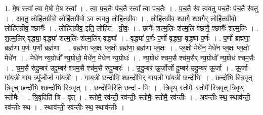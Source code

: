 \documentclass[17pt]{extarticle}
\begin{document}
1. मे॒ष स्त्वा᳚ त्वा मे॒षो मे॒ष स्त्वा᳚ । . त्वा॒ प॒च॒तैः प॑च॒तै स्त्वा᳚ त्वा पच॒तैः । . प॒च॒तै र॑व त्ववतु पच॒तैः प॑च॒तै र॑वतु । . अ॒व॒तु॒ लोहि॑तग्रीवो॒ लोहि॑तग्रीवो ऽव त्ववतु॒ लोहि॑तग्रीवः । . लोहि॑तग्रीव॒ श्छागै॒ श्छागै॒र् लोहि॑तग्रीवो॒ लोहि॑तग्रीव॒ श्छागैः᳚ । . लोहि॑तग्रीव॒ इति॒ लोहि॑त - ग्री॒वः॒ । . छागैः᳚ शल्म॒लिः श॑ल्म॒लि श्छागै॒ श्छागैः᳚ शल्म॒लिः । . श॒ल्म॒लिर् वृद्ध्या॒ वृद्ध्या॑ शल्म॒लिः श॑ल्म॒लिर् वृद्ध्या᳚ । . वृद्ध्या॑ प॒र्णः प॒र्णो वृद्ध्या॒ वृद्ध्या॑ प॒र्णः । . प॒र्णो ब्रह्म॑णा॒ ब्रह्म॑णा प॒र्णः प॒र्णो ब्रह्म॑णा । . ब्रह्म॑णा प्ल॒क्षः प्ल॒क्षो ब्रह्म॑णा॒ ब्रह्म॑णा प्ल॒क्षः । . प्ल॒क्षो मेधे॑न॒ मेधे॑न प्ल॒क्षः प्ल॒क्षो मेधे॑न । . मेधे॑न न्य॒ग्रोधो᳚ न्य॒ग्रोधो॒ मेधे॑न॒ मेधे॑न न्य॒ग्रोधः॑ । . न्य॒ग्रोध॑ श्चम॒सै श्च॑म॒सैर् न्य॒ग्रोधो᳚ न्य॒ग्रोध॑ श्चम॒सैः । . च॒म॒सै रु॑दु॒म्बर॑ उदु॒म्बर॑ श्चम॒सै श्च॑म॒सै रु॑दु॒म्बरः॑ । . उ॒दु॒म्बर॑ ऊ॒र्जोर्जो दु॒म्बर॑ उदु॒म्बर॑ ऊ॒र्जा । . ऊ॒र्जा गा॑य॒त्री गा॑य॒ त्र्यू᳚र्जोर्जा गा॑य॒त्री । . गा॒य॒त्री छन्दो॑भि॒ श्छन्दो॑भिर् गाय॒त्री गा॑य॒त्री छन्दो॑भिः । . छन्दो॑भि स्त्रि॒वृत् त्रि॒वृच् छन्दो॑भि॒ श्छन्दो॑भि स्त्रि॒वृत् । . छन्दो॑भि॒रिति॒ छन्दः॑ - भिः॒ । . त्रि॒वृथ् स्तोमैः॒ स्तोमै᳚ स्त्रि॒वृत् त्रि॒वृथ् स्तोमैः᳚ । . त्रि॒वृदिति॑ त्रि - वृत् । . स्तोमै॒ रव॑न्ती॒ रव॑न्तीः॒ स्तोमैः॒ स्तोमै॒ रव॑न्तीः । . अव॑न्तीः स्थ॒ स्थाव॑न्ती॒ रव॑न्तीः स्थ । . स्थाव॑न्ती॒ रव॑न्तीः स्थ॒ स्थाव॑न्तीः । \newline
\end{document}
